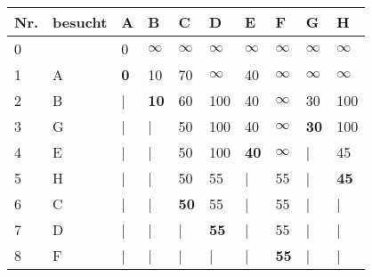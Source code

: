 \documentclass{lehramt-informatik-aufgabe}
\begin{document}
\begin{enumerate}
\begin{liAntwort}
\begin{tabular}{llllllllll}
\bf{Nr.}     & \bf{besucht} & \bf{A}       & \bf{B}       & \bf{C}       & \bf{D}       & \bf{E}       & \bf{F}       & \bf{G}       & \bf{H}       \\
\hline
0            &              & 0            & $\infty$     & $\infty$     & $\infty$     & $\infty$     & $\infty$     & $\infty$     & $\infty$     \\
1            & A            & \bf{0}       & 10           & 70           & $\infty$     & 40           & $\infty$     & $\infty$     & $\infty$     \\
2            & B            & |            & \bf{10}      & 60           & 100          & 40           & $\infty$     & 30           & 100          \\
3            & G            & |            & |            & 50           & 100          & 40           & $\infty$     & \bf{30}      & 100          \\
4            & E            & |            & |            & 50           & 100          & \bf{40}      & $\infty$     & |            & 45           \\
5            & H            & |            & |            & 50           & 55           & |            & 55           & |            & \bf{45}      \\
6            & C            & |            & |            & \bf{50}      & 55           & |            & 55           & |            & |            \\
7            & D            & |            & |            & |            & \bf{55}      & |            & 55           & |            & |            \\
8            & F            & |            & |            & |            & |            & |            & \bf{55}      & |            & |            \\
\end{tabular}


\end{liAntwort}
\end{enumerate}
\end{document}
